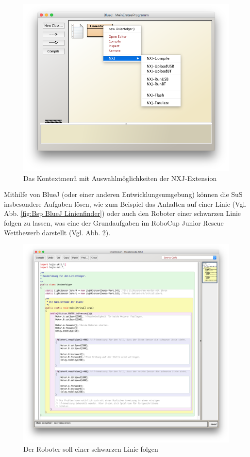 \documentclass[paper=a4, pagesize, DIV=calc, BCOR=15.5mm, twoside=on, onecolumn=on, open = right, titlepage =on, parskip =half-, headsepline = on, footsepline = on, chapterprefix = on, appendixprefix = off, fontsize = 12pt, numbers = noenddot, abstract = on]{scrbook}
\numberwithin{equation}{chapter}
\theoremstyle{definition}
\theoremstyle{plain}
\theoremstyle{plain}
\theoremstyle{remark}
\theoremstyle{plain}
\theoremstyle{plain}
\begin{document}
\begin{figure}[htbp]
\centering
\includegraphics[scale=0.4]{images/extension.png}
\caption{Das Kontextmenü mit Auswahlmöglichkeiten der NXJ-Extension}
\label{fig:extension}
\end{figure}

Mithilfe von BlueJ (oder einer anderen Entwicklungsumgebung) können die SuS insbesondere Aufgaben lösen, wie zum Beispiel das Anhalten auf einer Linie (Vgl. Abb. \ref{fig:Bsp BlueJ Linienfinder}) oder auch den Roboter einer schwarzen Linie folgen zu lassen, was eine der Grundaufgaben im RoboCup Junior Rescue Wettbewerb darstellt (Vgl. Abb. \ref{fig:Bsp BlueJ Linienfolger}).

\begin{figure}[htbp]
\centering
\includegraphics[scale=0.35]{images/linienfolger_bluej.png} 
\caption{Der Roboter soll einer schwarzen Linie folgen}
\label{fig:Bsp BlueJ Linienfolger}
\end{figure} 
\end{document}
